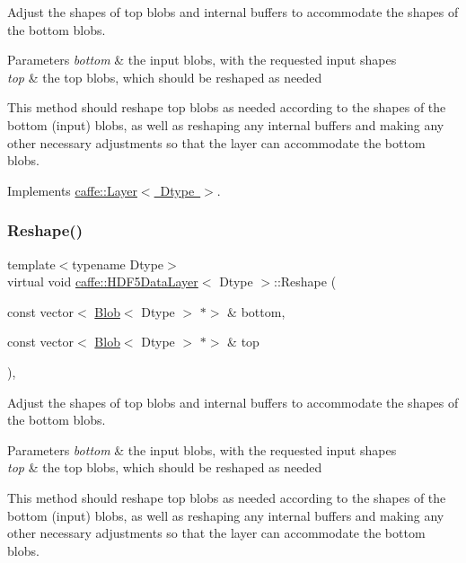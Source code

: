 Adjust the shapes of top blobs and internal buffers to accommodate the shapes of the bottom blobs. 


\begin{DoxyParams}{Parameters}
{\em bottom} & the input blobs, with the requested input shapes \\
\hline
{\em top} & the top blobs, which should be reshaped as needed\\
\hline
\end{DoxyParams}
This method should reshape top blobs as needed according to the shapes of the bottom (input) blobs, as well as reshaping any internal buffers and making any other necessary adjustments so that the layer can accommodate the bottom blobs. 

Implements \mbox{\hyperlink{classcaffe_1_1_layer_a7fe981e8af8d93d587acf2a952be563d}{caffe\+::\+Layer$<$ Dtype $>$}}.

\mbox{\label{classcaffe_1_1_h_d_f5_data_layer_a38b8924648ba4ab2933fe389fa608cad}} 
\subsubsection{\texorpdfstring{Reshape()}{Reshape()}\hspace{0.1cm}{\footnotesize\ttfamily [2/2]}}
{\footnotesize\ttfamily template$<$typename Dtype$>$ \\
virtual void \mbox{\hyperlink{classcaffe_1_1_h_d_f5_data_layer}{caffe\+::\+H\+D\+F5\+Data\+Layer}}$<$ Dtype $>$\+::Reshape (\begin{DoxyParamCaption}\item[{const vector$<$ \mbox{\hyperlink{classcaffe_1_1_blob}{Blob}}$<$ Dtype $>$ $\ast$$>$ \&}]{bottom,  }\item[{const vector$<$ \mbox{\hyperlink{classcaffe_1_1_blob}{Blob}}$<$ Dtype $>$ $\ast$$>$ \&}]{top }\end{DoxyParamCaption})\hspace{0.3cm}{\ttfamily [inline]}, {\ttfamily [virtual]}}



Adjust the shapes of top blobs and internal buffers to accommodate the shapes of the bottom blobs. 


\begin{DoxyParams}{Parameters}
{\em bottom} & the input blobs, with the requested input shapes \\
\hline
{\em top} & the top blobs, which should be reshaped as needed\\
\hline
\end{DoxyParams}
This method should reshape top blobs as needed according to the shapes of the bottom (input) blobs, as well as reshaping any internal buffers and making any other necessary adjustments so that the layer can accommodate the bottom blobs. 

